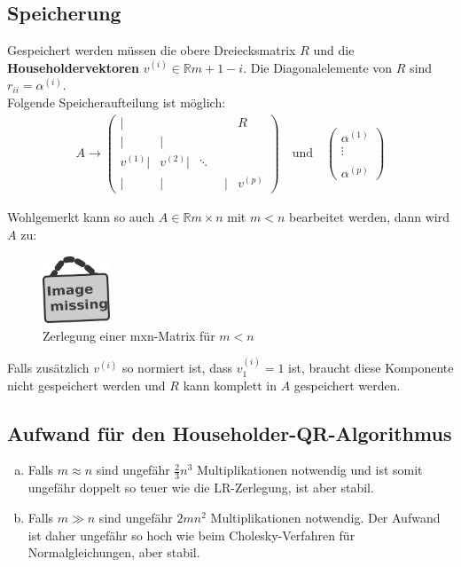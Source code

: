 \documentclass[ngerman,fontsize=11pt, paper=a4, parskip=half, titlepage=true, toc=bib]{scrbook}
\newcommand{\R}{\mathds{R}}
\newcommand{\imagemissing}[1]{
	\begin{figure}
		\parbox{\linewidth}{
			\centering
			\includegraphics[width=2cm]{images/image_missing.jpg}
		}
		\caption{#1}
	\end{figure}
}
\begin{document}
	\subsection{Speicherung}
	Gespeichert werden müssen die obere Dreiecksmatrix $R$ und die 
	\textbf{Householdervektoren} 
	$v^{(i)}\in \R{m+1-i}$.
	Die Diagonalelemente von $R$ sind $r_{ii} = \alpha^{(i)}$. \\
	Folgende Speicheraufteilung ist möglich:
	\begin{gather*}
		A \longrightarrow \left(
		\begin{array}{rrrrr}
			|&&& R \\
			|&| \\
			v^{(1)}| & v^{(2)}|&\ddots ~~\\
			| &|&\phantom{v^{(i)}}|& v^{(p)}			
		\end{array}
		\right)
		\quad \text{und} \quad 
		\begin{pmatrix}
			\alpha^{(1)} \\ \vdots \\ \\ \alpha^{(p)}
		\end{pmatrix}
	\end{gather*}
	  
	  Wohlgemerkt kann so auch $A\in \R{m\times n}$ mit $m<n$ bearbeitet werden,
	  dann wird $A$ zu:
	  
	  \imagemissing{Zerlegung einer mxn-Matrix für $m<n$}
	  
	  Falls zusätzlich $v^{(i)}$ so normiert ist,
	  dass $v_1^{(i)} = 1$ ist, braucht diese Komponente nicht gespeichert werden 
	  und $R$ kann komplett in $A$ gespeichert werden.
	  
	  \subsection{Aufwand für den Householder-QR-Algorithmus}
	  \begin{enumerate}[a)]
	  	\item Falls $m\approx n$ sind ungefähr $\frac{2}{3}n^3$ Multiplikationen notwendig
	  	und ist somit ungefähr doppelt so teuer wie die LR-Zerlegung, ist aber stabil.
	  	\item Falls $m\gg n$ sind ungefähr $2mn^2$ Multiplikationen notwendig.
	  	Der Aufwand ist daher ungefähr so hoch wie beim Cholesky-Verfahren für Normalgleichungen,
	  	aber stabil.
	  \end{enumerate}
	  
	  
\end{document}
